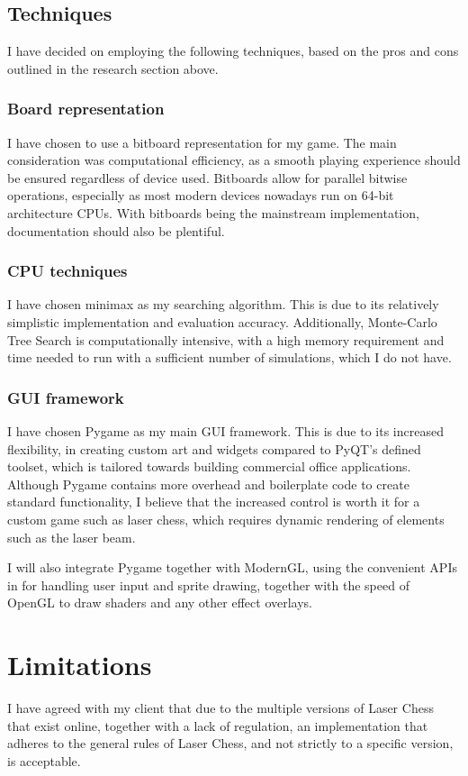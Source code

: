 \documentclass[../main/main.tex]{subfiles}
\begin{document}
\subsection{Techniques}
I have decided on employing the following techniques, based on the pros and cons outlined in the research section above.

\subsubsection*{Board representation}
I have chosen to use a bitboard representation for my game. The main consideration was computational efficiency, as a smooth playing experience should be ensured regardless of device used. Bitboards allow for parallel bitwise operations, especially as most modern devices nowadays run on 64-bit architecture CPUs. With bitboards being the mainstream implementation, documentation should also be plentiful.

\subsubsection*{CPU techniques}
I have chosen minimax as my searching algorithm. This is due to its relatively simplistic implementation and evaluation accuracy. Additionally, Monte-Carlo Tree Search is computationally intensive, with a high memory requirement and time needed to run with a sufficient number of simulations, which I do not have.

\subsubsection*{GUI framework}
I have chosen Pygame as my main GUI framework. This is due to its increased flexibility, in creating custom art and widgets compared to PyQT’s defined toolset, which is tailored towards building commercial office applications. Although Pygame contains more overhead and boilerplate code to create standard functionality, I believe that the increased control is worth it for a custom game such as laser chess, which requires dynamic rendering of elements such as the laser beam.

I will also integrate Pygame together with ModernGL, using the convenient APIs in for handling user input and sprite drawing, together with the speed of OpenGL to draw shaders and any other effect overlays.

\section{Limitations}
I have agreed with my client that due to the multiple versions of Laser Chess that exist online, together with a lack of regulation, an implementation that adheres to the general rules of Laser Chess, and not strictly to a specific version, is acceptable.
\end{document}
